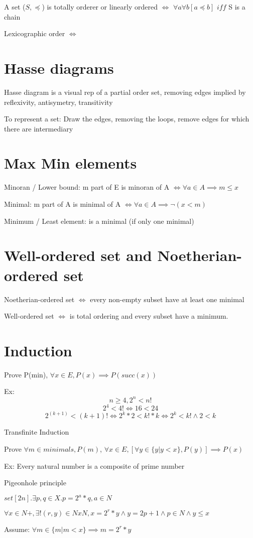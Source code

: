 \documentclass{article}
\begin{document}
A set ($S, \preccurlyeq$) is totally orderer or linearly ordered $\iff$ $\forall a \forall b [a \preccurlyeq b]$ $iff$ S is a chain

Lexicographic order $\iff$

\section{Hasse diagrams}

Hasse diagram is a visual rep of a partial order set, removing edges implied by reflexivity, antisymetry, transitivity

To represent a set: Draw the edges, removing the loops, remove edges for which there are intermediary

\section{Max Min elements}

Minoran / Lower bound: m part of E is minoran of A $\iff \forall a \in A \implies m \leq x$

Minimal: m part of A is minimal of A $\iff \forall a \in A \implies \neg (x < m)$

Minimum / Least element: is a minimal (if only one minimal)

\section{Well-ordered set and Noetherian-ordered set}

Noetherian-ordered set $\iff$ every non-empty subset have at least one minimal

Well-ordered set $\iff$ is total ordering and every subset have a minimum.

\section{Induction}

Prove P(min), $\forall x \in E, P(x) \implies P(succ(x))$

Ex:
\[n \geq 4, 2^n < n!\]
\[2^4 < 4! \iff 16 < 24\]
\[2^(k+1) < (k+1)! \iff 2^k * 2 < k! * k \iff 2^k < k! \wedge 2 < k\]

Transfinite Induction

Prove $\forall m \in minimals, P(m)$, $\forall x \in E, [\forall y \in \{y|y < x\}, P(y)] \implies P(x)$

Ex: Every natural number is a composite of prime number


Pigeonhole principle

$set [2n]. \exists p,q \in X. p = 2^a * q, a \in N$

$\forall x \in N+, \exists! (r,y) \in N x N, x = 2^r*y \wedge y=2p+1 \wedge p\in N \wedge y \leq x$

Assume: $\forall m \in \{m|m<x\} \implies m=2^r*y$
\end{document}
